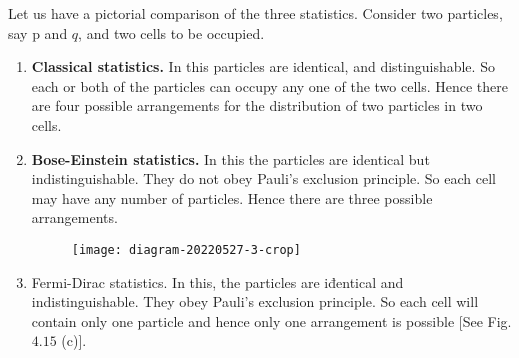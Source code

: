\par Let us have a pictorial comparison of the three statistics. Consider two particles, say p and $q$, and two cells to be occupied.
\begin{enumerate}
	\item  \textbf{Classical statistics.} In this particles are identical, and distinguishable. So each or both of the particles can occupy any one of the two cells. Hence there are four possible arrangements for the distribution of two particles in two cells.\\
	\item  \textbf{Bose-Einstein statistics.} In this the particles are identical but indistinguishable. They do not obey Pauli's exclusion principle. So each cell may have any number of particles. Hence there are three possible arrangements.
	\begin{figure}[H]
		\centering
		\texttt{[image: diagram-20220527-3-crop]}
	\end{figure}
	\item  Fermi-Dirac statistics. In this, the particles are iđentical and indistinguishable. They obey Pauli's exclusion principle. So each cell will contain only one particle and hence only one arrangement is possible [See Fig. $4.15$ (c)].
\end{enumerate}
